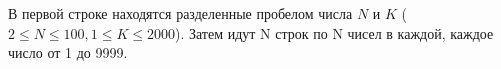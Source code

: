 В первой строке находятся разделенные пробелом числа $N$ и $K$ ($2 \le N \le 100, 1 \le K \le 2000$). Затем идут N строк по N чисел в каждой, каждое число от 1 до 9999.